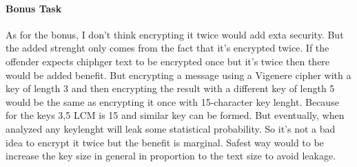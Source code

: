 \documentclass{article}
\begin{document}
\paragraph{Bonus Task} 
As for the bonus, I don't think encrypting it twice would add exta security. But the added strenght only comes from the fact that it's
encrypted twice. If the offender expects chiphger text to be encrypted once but it's twice then there would be added benefit. But encrypting a
message using a Vigenere cipher with a
key of
length 3 and then encrypting the result  with a different key of length 5 would be the same as encrypting it once with 15-character key
lenght. Because for the keys 3,5 LCM is 15 and similar key can be formed. But eventually, when analyzed any keylenght will leak some
statistical probability. So it's not a bad idea to encrypt it twice but the benefit is marginal. Safest way would to be increase the key
size in general in proportion to the text size to avoid leakage.\\
\end{document}
